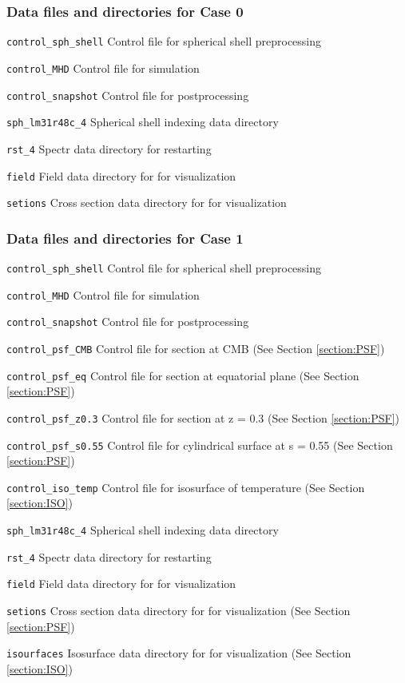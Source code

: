 \subsubsection{Data files and directories for Case 0}
\label{section:bench_case0}
%
\begin{description}
\item{\tt control\_sph\_shell}	Control file for spherical shell preprocessing
\item{\tt  control\_MHD}		Control file for simulation
\item{\tt control\_snapshot}	Control file for postprocessing
\item{\tt sph\_lm31r48c\_4} 	Spherical shell indexing data directory
\item{\tt rst\_4}				Spectr data directory for restarting
\item{\tt field}				Field data directory for for visualization
\item{\tt setions}			Cross section data directory for for visualization
\end{description}
%
\subsubsection{Data files and directories for Case 1}
\label{section:bench_case1}
%
\begin{description}
\item{\tt control\_sph\_shell}	Control file for spherical shell preprocessing
\item{\tt  control\_MHD}		Control file for simulation
\item{\tt control\_snapshot}	Control file for postprocessing
\item{\tt control\_psf\_CMB}	Control file for section at CMB (See Section \ref{section:PSF})
\item{\tt control\_psf\_eq}		Control file for section at equatorial plane (See Section \ref{section:PSF})
\item{\tt control\_psf\_z0.3}	Control file for section at z = 0.3 (See Section \ref{section:PSF})
\item{\tt control\_psf\_s0.55}	Control file for cylindrical surface at s = 0.55 (See Section \ref{section:PSF})
\item{\tt control\_iso\_temp}	Control file for isosurface of temperature (See Section \ref{section:ISO})
\item{\tt sph\_lm31r48c\_4} 	Spherical shell indexing data directory
\item{\tt rst\_4}				Spectr data directory for restarting
\item{\tt field}				Field data directory for for visualization
\item{\tt setions}			Cross section data directory for for visualization (See Section \ref{section:PSF})
\item{\tt isourfaces}			Isosurface data directory for for visualization (See Section \ref{section:ISO})
\end{description}

